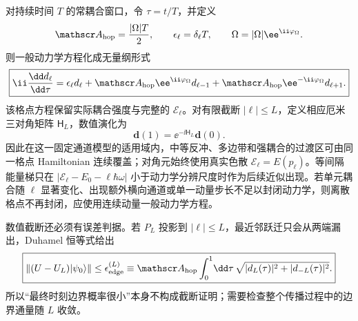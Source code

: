 对持续时间 $T$ 的常耦合窗口，令 $\tau=t/T$，并定义
\begin{equation*}
\mathscr A_{\rm hop}=\frac{|\Omega|T}{2},
\qquad
\epsilon_\ell=\delta_\ell T,
\qquad
\Omega=|\Omega|\ee^{\ii\varphi_\Omega}.
\end{equation*}
则一般动力学方程化成无量纲形式
\begin{equation}
\boxed{
\ii\frac{\dd d_\ell}{\dd\tau}
=\epsilon_\ell d_\ell
+\mathscr A_{\rm hop}\ee^{\ii\varphi_\Omega}d_{\ell-1}
+\mathscr A_{\rm hop}\ee^{-\ii\varphi_\Omega}d_{\ell+1}.}
\label{eq:recoil_dimensionless_exact_lattice}
\end{equation}
该格点方程保留实际耦合强度与完整的 $\mathcal E_\ell$。对有限截断 $|\ell|\le L$，定义相应厄米三对角矩阵 $\mathsf H_L$，数值演化为
\begin{equation}
\boxed{\mathbf d(1)=\ee^{-\ii\mathsf H_L}\mathbf d(0).}
\label{eq:recoil_finite_lattice_matrix_exponential}
\end{equation}
因此在这一固定通道模型的适用域内，中等反冲、多边带和强耦合的过渡区可由同一格点 Hamiltonian 连续覆盖；对角元始终使用真实色散 $\mathcal E_\ell=E(p_\ell)$。等间隔能量梯只在 $|\mathcal E_\ell-E_0-\ell\hbar\omega|$ 小于动力学分辨尺度时作为后续近似出现。若单元耦合随 $\ell$ 显著变化、出现额外横向通道或单一动量步长不足以封闭动力学，则离散格点不再封闭，应使用连续动量一般动力学方程。

数值截断还必须有误差判据。若 $P_L$ 投影到 $|\ell|\le L$，最近邻跃迁只会从两端漏出，Duhamel 恒等式给出
\begin{equation}
\boxed{
\left\|(U-U_L)|\psi_0\rangle\right\|
\le
\epsilon_{\rm edge}^{(L)}
\equiv
\mathscr A_{\rm hop}\int_0^1\!\dd\tau\,
\sqrt{|d_L(\tau)|^2+|d_{-L}(\tau)|^2}.}
\label{eq:recoil_lattice_truncation_duhamel_bound}
\end{equation}
所以“最终时刻边界概率很小”本身不构成截断证明；需要检查整个传播过程中的边界通量随 $L$ 收敛。

